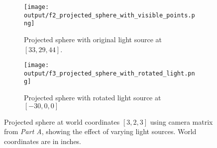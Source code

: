 \documentclass[12pt]{report}
\begin{document}
\begin{enumerate}

    \begin{figure}[!ht]\centering
        \hspace*{-1.2in}
        \begin{subfigure}{0.6\textwidth}
            \texttt{[image: output/f2\_projected\_sphere\_with\_visible\_points.png]}
            \caption{Projected sphere with original light source at $[33, 29, 44]$.}
            \label{fig:Figure2a}
        \end{subfigure}
    \vfil
        \hspace*{-1.2in}
        \begin{subfigure}{0.6\textwidth}
        \texttt{[image: output/f3\_projected\_sphere\_with\_rotated\_light.png]}
        \caption{Projected sphere with rotated light source at $[-30, 0, 0]$}
        \label{fig:Figure2b}
        \end{subfigure}
        \caption{Projected sphere at world coordinates $[3,2,3]$ using camera matrix from \emph{Part A}, 
        showing the effect of varying light sources. World coordinates are in inches.}
        \label{fig:Figure2}
    \end{figure}

    \FloatBarrier 






\end{enumerate}
\end{document}
